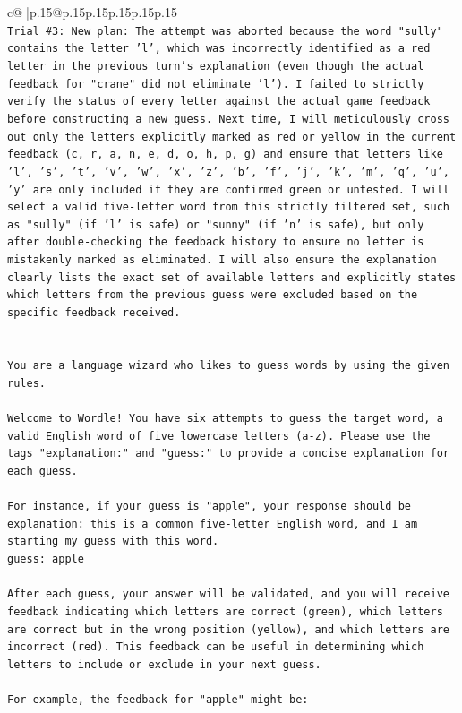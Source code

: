 \documentclass{article}
\begin{document}
{\begin{supertabular}{c@{$\;$}|p{.15\linewidth}@{}p{.15\linewidth}p{.15\linewidth}p{.15\linewidth}p{.15\linewidth}p{.15\linewidth}}
{{{\\ 
\texttt{Trial \#3: New plan: The attempt was aborted because the word "sully" contains the letter 'l', which was incorrectly identified as a red letter in the previous turn's explanation (even though the actual feedback for "crane" did not eliminate 'l'). I failed to strictly verify the status of every letter against the actual game feedback before constructing a new guess. Next time, I will meticulously cross out only the letters explicitly marked as red or yellow in the current feedback (c, r, a, n, e, d, o, h, p, g) and ensure that letters like 'l', 's', 't', 'v', 'w', 'x', 'z', 'b', 'f', 'j', 'k', 'm', 'q', 'u', 'y' are only included if they are confirmed green or untested. I will select a valid five{-}letter word from this strictly filtered set, such as "sully" (if 'l' is safe) or "sunny" (if 'n' is safe), but only after double{-}checking the feedback history to ensure no letter is mistakenly marked as eliminated. I will also ensure the explanation clearly lists the exact set of available letters and explicitly states which letters from the previous guess were excluded based on the specific feedback received.} \\
\\ 
\\ 
\texttt{You are a language wizard who likes to guess words by using the given rules.} \\
\\ 
\texttt{Welcome to Wordle! You have six attempts to guess the target word, a valid English word of five lowercase letters (a{-}z). Please use the tags "explanation:" and "guess:" to provide a concise explanation for each guess.} \\
\\ 
\texttt{For instance, if your guess is "apple", your response should be} \\
\texttt{explanation: this is a common five{-}letter English word, and I am starting my guess with this word.} \\
\texttt{guess: apple} \\
\\ 
\texttt{After each guess, your answer will be validated, and you will receive feedback indicating which letters are correct (green), which letters are correct but in the wrong position (yellow), and which letters are incorrect (red). This feedback can be useful in determining which letters to include or exclude in your next guess.} \\
\\ 
\texttt{For example, the feedback for "apple" might be:} \\
}}}
\end{supertabular}}
\end{document}
